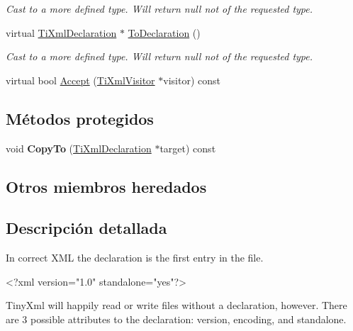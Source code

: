\begin{DoxyCompactItemize}
\begin{DoxyCompactList}\small\item\em Cast to a more defined type. Will return null not of the requested type. \end{DoxyCompactList}\item 
\hypertarget{class_ti_xml_declaration_a6bd3d1daddcaeb9543c24bfd090969ce}{virtual \hyperlink{class_ti_xml_declaration}{Ti\-Xml\-Declaration} $\ast$ \hyperlink{class_ti_xml_declaration_a6bd3d1daddcaeb9543c24bfd090969ce}{To\-Declaration} ()}\label{class_ti_xml_declaration_a6bd3d1daddcaeb9543c24bfd090969ce}

\begin{DoxyCompactList}\small\item\em Cast to a more defined type. Will return null not of the requested type. \end{DoxyCompactList}\item 
virtual bool \hyperlink{class_ti_xml_declaration_ab6a6b178161ba9abc2c35058de689864}{Accept} (\hyperlink{class_ti_xml_visitor}{Ti\-Xml\-Visitor} $\ast$visitor) const 
\end{DoxyCompactItemize}
\subsection*{Métodos protegidos}
\begin{DoxyCompactItemize}
\item 
\hypertarget{class_ti_xml_declaration_a9d08959f935421a593032bd3efb30c38}{void {\bfseries Copy\-To} (\hyperlink{class_ti_xml_declaration}{Ti\-Xml\-Declaration} $\ast$target) const }\label{class_ti_xml_declaration_a9d08959f935421a593032bd3efb30c38}

\end{DoxyCompactItemize}
\subsection*{Otros miembros heredados}


\subsection{Descripción detallada}
In correct X\-M\-L the declaration is the first entry in the file. \begin{DoxyVerb}    <?xml version="1.0" standalone="yes"?>
\end{DoxyVerb}


Tiny\-Xml will happily read or write files without a declaration, however. There are 3 possible attributes to the declaration\-: version, encoding, and standalone.

